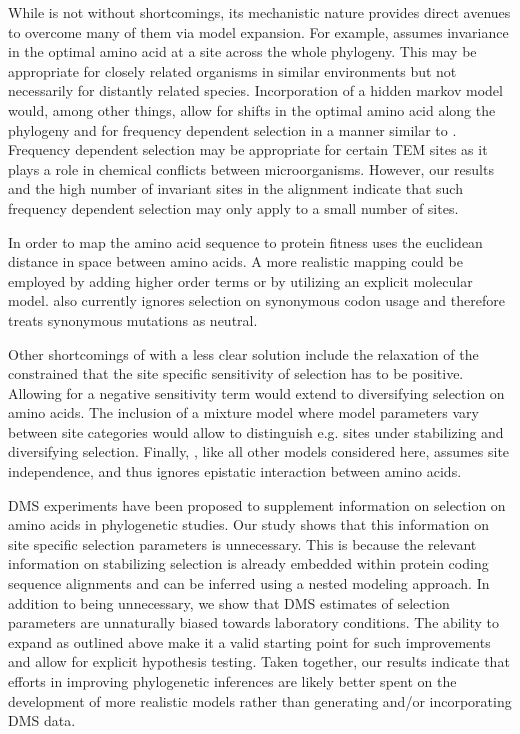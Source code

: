 \documentclass[fleqn,letterpaper]{article}
\begin{document}
While \selac is not without shortcomings, its mechanistic nature provides direct avenues to overcome many of them via model expansion.
For example, \selac assumes invariance in the optimal amino acid at a site across the whole phylogeny.
This may be appropriate for closely related organisms in similar environments but not necessarily for distantly related species.
Incorporation of a hidden markov model would, among other things, allow for shifts in the optimal amino acid along the phylogeny and for frequency dependent selection in a manner similar to \gy.
Frequency dependent selection may be appropriate for certain TEM sites as it plays a role in chemical conflicts between microorganisms.
However, our results and the high number of invariant sites in the alignment indicate that such frequency dependent selection may only apply to a small number of sites.

In order to map the amino acid sequence to protein fitness \selac uses the euclidean distance in \PC space between amino acids. 
A more realistic mapping could be employed by adding higher order terms or by utilizing an explicit molecular model.
\selac also currently ignores selection on synonymous codon usage and therefore treats synonymous mutations as neutral.

Other shortcomings of \selac with a less clear solution include the relaxation of the constrained that the site specific sensitivity of selection has to be positive.
Allowing for a negative sensitivity term would extend \selac to diversifying selection on amino acids.
The inclusion of a mixture model where model parameters vary between site categories would allow to distinguish e.g. sites under stabilizing and diversifying selection.
Finally, \selac, like all other models considered here, assumes site independence, and thus ignores epistatic interaction between amino acids.

DMS experiments have been proposed to supplement information on selection on amino acids in phylogenetic studies.
Our study shows that this information on site specific selection parameters is unnecessary.
This is because the relevant information on stabilizing selection is already embedded within protein coding sequence alignments and can be inferred using a nested modeling approach.
In addition to being unnecessary, we show that DMS estimates of selection parameters are unnaturally biased towards laboratory conditions.
The ability to expand \selac as outlined above make it a valid starting point for such improvements and allow for explicit hypothesis testing.
Taken together, our results indicate that efforts in improving phylogenetic inferences are likely better spent on the development of more realistic models rather than generating and/or incorporating DMS data.
\end{document}

